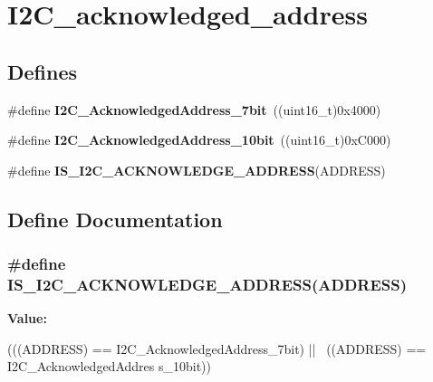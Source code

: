 \hypertarget{group__I2C__acknowledged__address}{
\section{I2C\_\-acknowledged\_\-address}
\label{group__I2C__acknowledged__address}
}
\subsection*{Defines}
\begin{DoxyCompactItemize}
\item 
\hypertarget{group__I2C__acknowledged__address_ga5e5ad2148f9da14457c7b59357acee97}{
\#define {\bfseries I2C\_\-AcknowledgedAddress\_\-7bit}~((uint16\_\-t)0x4000)}
\label{group__I2C__acknowledged__address_ga5e5ad2148f9da14457c7b59357acee97}

\item 
\hypertarget{group__I2C__acknowledged__address_gaf0bb8f71795f046ad9f6c1fc7fe0fc53}{
\#define {\bfseries I2C\_\-AcknowledgedAddress\_\-10bit}~((uint16\_\-t)0xC000)}
\label{group__I2C__acknowledged__address_gaf0bb8f71795f046ad9f6c1fc7fe0fc53}

\item 
\#define {\bfseries IS\_\-I2C\_\-ACKNOWLEDGE\_\-ADDRESS}(ADDRESS)
\end{DoxyCompactItemize}


\subsection{Define Documentation}
\hypertarget{group__I2C__acknowledged__address_ga26a3af0a468f7226ed72fde27528c0ba}{
\subsubsection[{IS\_\-I2C\_\-ACKNOWLEDGE\_\-ADDRESS}]{\setlength{\rightskip}{0pt plus 5cm}\#define IS\_\-I2C\_\-ACKNOWLEDGE\_\-ADDRESS(ADDRESS)}}
\label{group__I2C__acknowledged__address_ga26a3af0a468f7226ed72fde27528c0ba}
{\bfseries Value:}
\begin{DoxyCode}
(((ADDRESS) == I2C_AcknowledgedAddress_7bit) || \
                                             ((ADDRESS) == I2C_AcknowledgedAddres
      s_10bit))
\end{DoxyCode}
